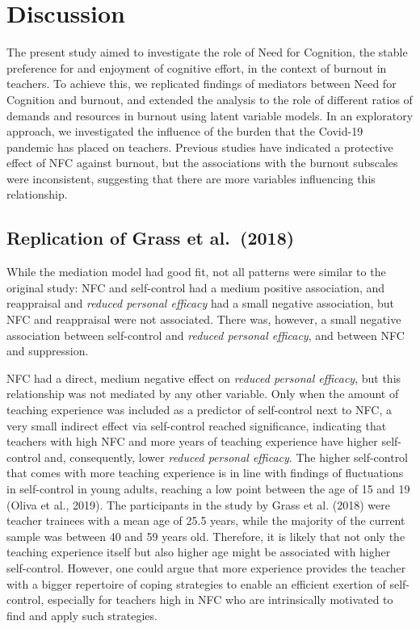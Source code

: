 \documentclass[
  english,
  man,floatsintext]{apa6}
\begin{document}
\hypertarget{discussion}{%
\section{Discussion}\label{discussion}}

The present study aimed to investigate the role of Need for Cognition, the stable preference for and enjoyment of cognitive effort, in the context of burnout in teachers.
To achieve this, we replicated findings of mediators between Need for Cognition and burnout, and extended the analysis to the role of different ratios of demands and resources in burnout using latent variable models.
In an exploratory approach, we investigated the influence of the burden that the Covid-19 pandemic has placed on teachers.
Previous studies have indicated a protective effect of NFC against burnout, but the associations with the burnout subscales were inconsistent, suggesting that there are more variables influencing this relationship.

\hypertarget{replication-of-grass-et-al.-2018-2}{%
\subsection{Replication of Grass et al.~(2018)}\label{replication-of-grass-et-al.-2018-2}}

While the mediation model had good fit, not all patterns were similar to the original study: NFC and self-control had a medium positive association, and reappraisal and \emph{reduced personal efficacy} had a small negative association, but NFC and reappraisal were not associated.
There was, however, a small negative association between self-control and \emph{reduced personal efficacy}, and between NFC and suppression.

NFC had a direct, medium negative effect on \emph{reduced personal efficacy}, but this relationship was not mediated by any other variable.
Only when the amount of teaching experience was included as a predictor of self-control next to NFC, a very small indirect effect via self-control reached significance, indicating that teachers with high NFC and more years of teaching experience have higher self-control and, consequently, lower \emph{reduced personal efficacy}.
The higher self-control that comes with more teaching experience is in line with findings of fluctuations in self-control in young adults, reaching a low point between the age of 15 and 19 (Oliva et al., 2019).
The participants in the study by Grass et al. (2018) were teacher trainees with a mean age of 25.5 years, while the majority of the current sample was between 40 and 59 years old.
Therefore, it is likely that not only the teaching experience itself but also higher age might be associated with higher self-control.
However, one could argue that more experience provides the teacher with a bigger repertoire of coping strategies to enable an efficient exertion of self-control, especially for teachers high in NFC who are intrinsically motivated to find and apply such strategies.
\end{document}
